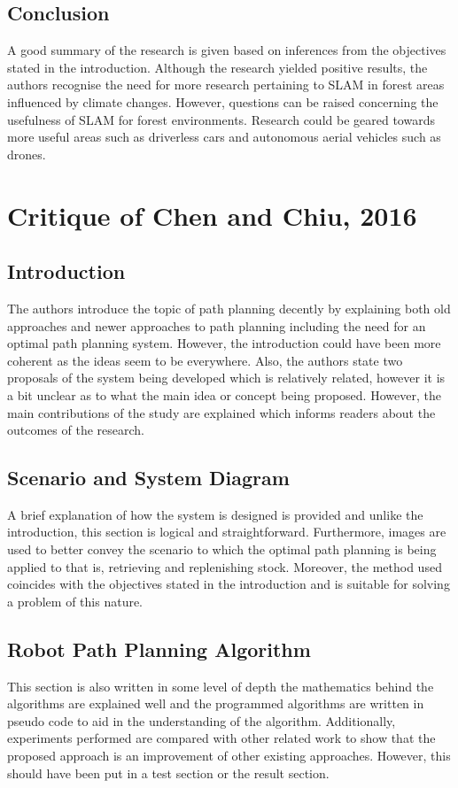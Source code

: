 \documentclass[a4paper, 12pt]{article}
\begin{document}
\subsection{Conclusion}
A good summary of the research is given based on inferences from the objectives stated in the introduction. Although the research yielded positive results, the authors recognise the need for more research pertaining to SLAM in forest areas influenced by climate changes. However, questions can be raised concerning the usefulness of SLAM for forest environments. Research could be geared towards more useful areas such as driverless cars and autonomous aerial vehicles such as drones.

\section{Critique of Chen and Chiu, 2016}

\subsection{Introduction}
The authors introduce the topic of path planning decently by explaining both old approaches and newer approaches to path planning including the need for an optimal path planning system. However, the introduction could have been more coherent as the ideas seem to be everywhere. Also, the authors state two proposals of the system being developed which is relatively related, however it is a bit unclear as to what the main idea or concept being proposed. However, the main contributions of the study are explained which informs readers about the outcomes of the research. 

\subsection{Scenario and System Diagram}
A brief explanation of how the system is designed is provided and unlike the introduction, this section is logical and straightforward. Furthermore, images are used to better convey the scenario to which the optimal path planning is being applied to that is, retrieving and replenishing stock. Moreover, the method used coincides with the objectives stated in the introduction and is suitable for solving a problem of this nature.


\subsection{Robot Path Planning Algorithm}
 This section is also written in some level of depth the mathematics behind the algorithms are explained well and the programmed algorithms are written in pseudo code to aid in the understanding of the algorithm. Additionally, experiments performed are compared with other related work to show that the proposed approach is an improvement of other existing approaches. However, this should have been put in a test section or the result section. 
\end{document}
